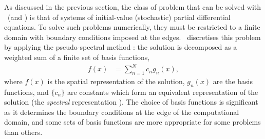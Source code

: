 As discussed in the previous section, the class of problem that can be solved with \xpdeint\ (and \XMDS) is that of systems of initial-value (stochastic) partial differential equations.  To solve such problems numerically, they must be restricted to a finite domain with boundary conditions imposed at the edges.  \xpdeint\ discretises this problem by applying the pseudo-spectral method \citep{SpectralMethods}: the solution is decomposed as a weighted sum of a finite set of basis functions,
\begin{align}
    f(x) &= \sum_{n=1}^{N} c_n g_n(x),
\end{align}
where $f(x)$ is the spatial representation of the solution, $g_n(x)$ are the basis functions, and $\{c_n\}$ are constants which form an equivalent representation of the solution (the \emph{spectral} representation \citep{SpectralMethods}).  The choice of basis functions is significant as it determines the boundary conditions at the edge of the computational domain, and some sets of basis functions are more appropriate for some problems than others.  

